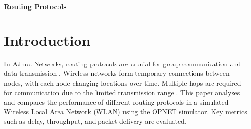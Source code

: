 \documentclass{article}
\begin{document}
	\begin{center}
		\Large{\textbf{Routing Protocols}}
	\end{center}
	\section{Introduction}
	In Adhoc Networks, routing protocols are crucial for group communication and data transmission \cite{hardtoshare}. Wireless networks form temporary connections between nodes, with each node changing locations over time. Multiple hops are required for communication due to the limited transmission range \cite{resource}. This paper analyzes and compares the performance of different routing protocols in a simulated Wireless Local Area Network (WLAN) using the OPNET simulator. Key metrics such as delay, throughput, and packet delivery are evaluated.
	
	
	
\end{document}
